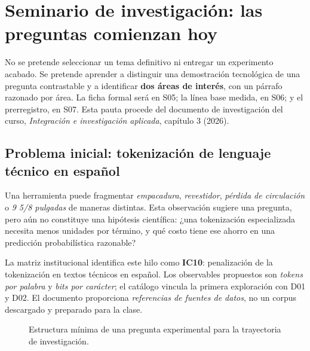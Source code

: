 \chapter*{Seminario de investigación: las preguntas comienzan hoy}
\begin{investigacion}
No se pretende seleccionar un tema definitivo ni entregar un experimento acabado.
Se pretende aprender a distinguir una demostración tecnológica de una pregunta
contrastable y a identificar \textbf{dos áreas de interés}, con un párrafo razonado
por área. La ficha formal será en S05; la línea base medida, en S06; y el
prerregistro, en S07. Esta pauta procede del documento de investigación del curso,
\emph{Integración e investigación aplicada}, capítulo 3 (2026).
\end{investigacion}

\section*{Problema inicial: tokenización de lenguaje técnico en español}
Una herramienta puede fragmentar \emph{empacadura}, \emph{revestidor},
\emph{pérdida de circulación} o \emph{9 5/8 pulgadas} de maneras distintas.
Esta observación sugiere una pregunta, pero aún no constituye una hipótesis
científica: ¿una tokenización especializada necesita menos unidades por término,
y qué costo tiene ese ahorro en una predicción probabilística razonable?

La matriz institucional identifica este hilo como \textbf{IC10}: penalización de
la tokenización en textos técnicos en español. Los observables propuestos son
\emph{tokens por palabra} y \emph{bits por carácter}; el catálogo vincula la
primera exploración con D01 y D02. El documento proporciona \emph{referencias de
fuentes de datos}, no un corpus descargado y preparado para la clase.

\begin{figure}[H]\centering
{}
\caption{Estructura mínima de una pregunta experimental para la trayectoria de investigación.}
\end{figure}

